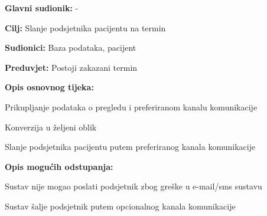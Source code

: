					\noindent {}
					\begin{packed_item}
	
						\item \textbf{Glavni sudionik: }-
						\item  \textbf{Cilj:} Slanje podsjetnika pacijentu na termin
						\item  \textbf{Sudionici:} Baza podataka, pacijent
						\item  \textbf{Preduvjet:} Postoji zakazani termin
						\item  \textbf{Opis osnovnog tijeka:}
						
						\item[] \begin{packed_enum}
	
							\item Prikupljanje podataka o pregledu i preferiranom kanalu komunikacije
							\item Konverzija u željeni oblik
							\item Slanje podsjetnika pacijentu putem preferiranog kanala komunikacije
						\end{packed_enum}
						
						\item  \textbf{Opis mogućih odstupanja:}
						
						\item[] \begin{packed_item}
	
							\item[3.a] Sustav nije mogao poslati podsjetnik zbog greške u e-mail/sms sustavu
							\item[] \begin{packed_enum}
								
								\item Sustav šalje podsjetnik putem opcionalnog kanala komunikacije
						
							\end{packed_enum}
							
						\end{packed_item}
					\end{packed_item}
					
